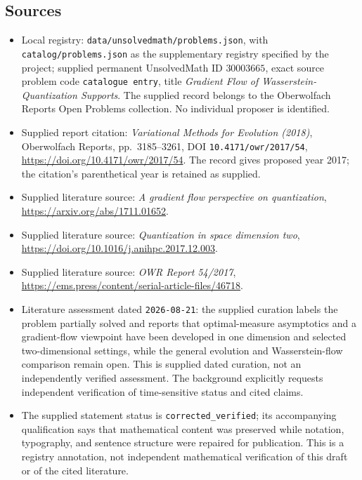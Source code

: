 \documentclass[11pt]{article}
\begin{document}
\subsection{Sources}
\begin{itemize}
\item Local registry: \texttt{data/unsolvedmath/problems.json}, with \texttt{catalog/problems.json} as the supplementary registry specified by the project; supplied permanent UnsolvedMath ID \(30003665\), exact source problem code \texttt{catalogue entry}, title \emph{Gradient Flow of Wasserstein-Quantization Supports}. The supplied record belongs to the Oberwolfach Reports Open Problems collection. No individual proposer is identified.
\item Supplied report citation: \emph{Variational Methods for Evolution (2018)}, Oberwolfach Reports, pp.\ 3185--3261, DOI \texttt{10.4171/owr/2017/54}, \url{https://doi.org/10.4171/owr/2017/54}. The record gives proposed year 2017; the citation's parenthetical year is retained as supplied.
\item Supplied literature source: \emph{A gradient flow perspective on quantization}, \url{https://arxiv.org/abs/1711.01652}.
\item Supplied literature source: \emph{Quantization in space dimension two}, \url{https://doi.org/10.1016/j.anihpc.2017.12.003}.
\item Supplied literature source: \emph{OWR Report 54/2017}, \url{https://ems.press/content/serial-article-files/46718}.
\item Literature assessment dated \texttt{2026-08-21}: the supplied curation labels the problem partially solved and reports that optimal-measure asymptotics and a gradient-flow viewpoint have been developed in one dimension and selected two-dimensional settings, while the general evolution and Wasserstein-flow comparison remain open. This is supplied dated curation, not an independently verified assessment. The background explicitly requests independent verification of time-sensitive status and cited claims.
\item The supplied statement status is \texttt{corrected\_verified}; its accompanying qualification says that mathematical content was preserved while notation, typography, and sentence structure were repaired for publication. This is a registry annotation, not independent mathematical verification of this draft or of the cited literature.
\end{itemize}
\end{document}
